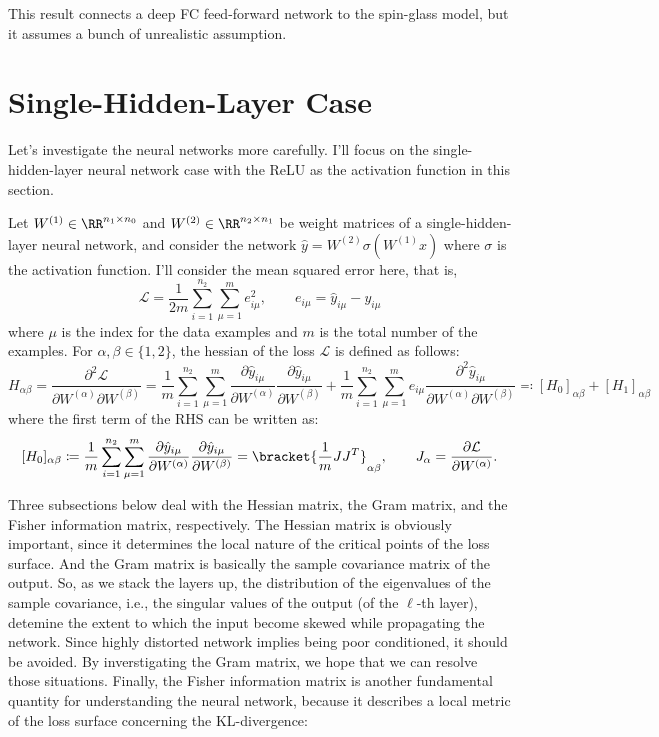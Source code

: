 \documentclass[notitlepage]{report}
\begin{document}
This result connects a deep FC feed-forward network to the spin-glass model, but it assumes a bunch of unrealistic assumption.


\section{Single-Hidden-Layer Case}

Let's investigate the neural networks more carefully. I'll focus on the single-hidden-layer neural network case with the ReLU as the activation function in this section.

Let $W^{(1)} \in \RR^{n_1\times n_0}$ and $W^{(2)} \in \RR^{n_2\times n_1}$ be weight matrices of a single-hidden-layer neural network, and consider the network $\hat y = W^{(2)} \sigma( W^{(1)}x )$ where $\sigma$ is the activation function. I'll consider the mean squared error here, that is,
\[ \mathcal L = \frac{1}{2m} \sum_{i=1}^{n_2} \sum_{\mu=1}^m e_{i\mu}^2,\qquad  e_{i\mu} = \hat y_{i\mu} - y_{i\mu} \]
where $\mu$ is the index for the data examples and $m$ is the total number of the examples. For $\alpha,\beta \in \{1,2\}$, the hessian of the loss $\mathcal L$ is defined as follows:
\[ H_{\alpha\beta} = \frac{\partial^2 \mathcal L}{\partial W^{(\alpha)}\partial W^{(\beta)}} = \frac 1m \sum_{i=1}^{n_2} \sum_{\mu=1}^m \frac{\partial \hat y_{i\mu}}{\partial W^{(\alpha)}}\frac{\partial \hat y_{i\mu}}{\partial W^{(\beta)}} + \frac 1 m \sum_{i=1}^{n_2} \sum_{\mu=1}^m e_{i\mu} \frac{\partial^2 \hat y_{i\mu}}{\partial W^{(\alpha)}\partial W^{(\beta)}} \eqqcolon [H_0]_{\alpha\beta} + [H_1]_{\alpha\beta} \]
where the first term of the RHS can be written as:
\[ [H_0]_{\alpha\beta} \coloneqq  \frac 1m \sum_{i=1}^{n_2} \sum_{\mu=1}^m \frac{\partial \hat y_{i\mu}}{\partial W^{(\alpha)}}\frac{\partial \hat y_{i\mu}}{\partial W^{(\beta)}} = \bracket{\frac 1 m JJ^T}_{\alpha\beta},\qquad J_\alpha = \frac{\partial \mathcal L}{\partial W^{(\alpha)}}. \]

Three subsections below deal with the Hessian matrix, the Gram matrix, and the Fisher information matrix, respectively. The Hessian matrix is obviously important, since it determines the local nature of the critical points of the loss surface. And the Gram matrix is basically the sample covariance matrix of the output. So, as we stack the layers up, the distribution of the eigenvalues of the sample covariance, i.e., the singular values of the output (of the $\ell$-th layer), detemine the extent to which the input become skewed while propagating the network. Since highly distorted network implies being poor conditioned, it should be avoided. By inverstigating the Gram matrix, we hope that we can resolve those situations. Finally, the Fisher information matrix is another fundamental quantity for understanding the neural network, because it describes a local metric of the loss surface concerning the KL-divergence: 
\end{document}

